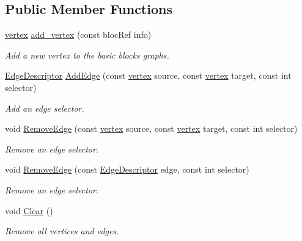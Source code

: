 \subsection*{Public Member Functions}
\begin{DoxyCompactItemize}
\item 
\hyperlink{graph_8hpp_abefdcf0544e601805af44eca032cca14}{vertex} \hyperlink{classBasicBlocksGraphConstructor_a41ed65b4ee48cb0d825f89abcf7de575}{add\+\_\+vertex} (const bloc\+Ref info)
\begin{DoxyCompactList}\small\item\em Add a new vertex to the basic blocks graphs. \end{DoxyCompactList}\item 
\hyperlink{graph_8hpp_a9eb9afea34e09f484b21f2efd263dd48}{Edge\+Descriptor} \hyperlink{classBasicBlocksGraphConstructor_a40ce400031161e9fb4e09869bcaff221}{Add\+Edge} (const \hyperlink{graph_8hpp_abefdcf0544e601805af44eca032cca14}{vertex} source, const \hyperlink{graph_8hpp_abefdcf0544e601805af44eca032cca14}{vertex} target, const int selector)
\begin{DoxyCompactList}\small\item\em Add an edge selector. \end{DoxyCompactList}\item 
void \hyperlink{classBasicBlocksGraphConstructor_a99505b0a5cf3962fb5b95494d0158706}{Remove\+Edge} (const \hyperlink{graph_8hpp_abefdcf0544e601805af44eca032cca14}{vertex} source, const \hyperlink{graph_8hpp_abefdcf0544e601805af44eca032cca14}{vertex} target, const int selector)
\begin{DoxyCompactList}\small\item\em Remove an edge selector. \end{DoxyCompactList}\item 
void \hyperlink{classBasicBlocksGraphConstructor_ab22a70b9c33d49a5a6d34434df1eb109}{Remove\+Edge} (const \hyperlink{graph_8hpp_a9eb9afea34e09f484b21f2efd263dd48}{Edge\+Descriptor} edge, const int selector)
\begin{DoxyCompactList}\small\item\em Remove an edge selector. \end{DoxyCompactList}\item 
void \hyperlink{classBasicBlocksGraphConstructor_af924271eb9b64c496a14b920012b0993}{Clear} ()
\begin{DoxyCompactList}\small\item\em Remove all vertices and edges. \end{DoxyCompactList}\item 

\end{DoxyCompactItemize}

